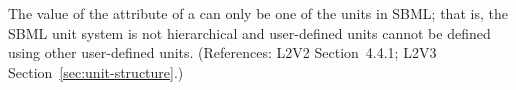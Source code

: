 The value of the  attribute of a \Unit can only be
one of the  units in SBML; that is, the SBML unit
system is not hierarchical and user-defined units cannot be defined using
other user-defined units.  (References: L2V2 Section~4.4.1;
L2V3 Section~\ref{sec:unit-structure}.)
